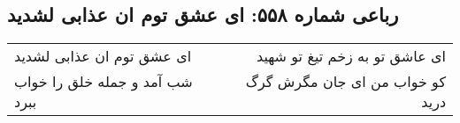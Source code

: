 \begin{center}
\section*{رباعی شماره ۵۵۸: ای عشق توم ان عذابی لشدید}
\label{sec:0558}
\begin{longtable}{l p{0.5cm} r}
ای عشق توم ان عذابی لشدید
&&
ای عاشق تو به زخم تیغ تو شهید
\\
شب آمد و جمله خلق را خواب ببرد
&&
کو خواب من ای جان مگرش گرگ درید
\\
\end{longtable}
\end{center}
